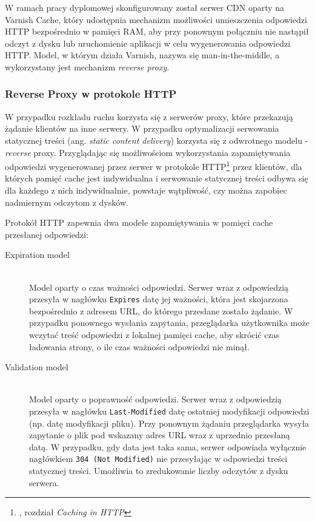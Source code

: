W ramach pracy dyplomowej skonfigurowany został serwer CDN oparty na Varnish Cache, który udostępnia mechanizm możliwości umieszczenia odpowiedzi HTTP bezpośrednio w pamięci RAM, aby przy ponownym połączniu nie nastąpił odczyt z dysku lub uruchomienie aplikacji w celu wygenerowania odpowiedzi HTTP. Model, w którym działa Varnish, nazywa się man-in-the-middle, a wykorzystany jest mechanizm \emph{reverse proxy}.

\subsubsection{Reverse Proxy w protokole HTTP}

W przypadku rozkładu ruchu korzysta się z serwerów proxy, które przekazują żądanie klientów na inne serwery. W przypadku optymalizacji serwowania statycznej treści (ang. \emph{static content delivery}) korzysta się z odwrotnego modelu - \emph{reverse} proxy. Przyglądając się możliwościom wykorzystania zapamiętywania odpowiedzi wygenerowanej przez serwer w protokole HTTP\cite{http-rfc}\footnote{\cite{http-rfc}, rozdział \emph{Caching in HTTP}} przez klientów, dla których pamięć cache jest indywidualna i serwowanie statycznej treści odbywa się dla każdego z nich indywidualnie, powstaje wątpliwość, czy można zapobiec nadmiernym odczytom z dysków.

Protokół HTTP zapewnia dwa modele zapamiętywania w pamięci cache przesłanej odpowiedzi:

\begin{description}
  \item[Expiration model] \hfill \\
  Model oparty o czas ważności odpowiedzi. Serwer wraz z odpowiedzią przesyła w nagłówku \lstinline{Expires} datę jej ważności, która jest skojarzona bezpośrednio z adresem URL, do którego przesłane zostało żądanie. W przypadku ponownego wysłania zapytania, przeglądarka użytkownika może wczytać treść odpowiedzi z lokalnej pamięci cache, aby skrócić czas ładowania strony, o ile czas ważności odpowiedzi nie minął.
  \item[Validation model] \hfill \\
  Model oparty o poprawność odpowiedzi. Serwer wraz z odpowiedzią przesyła w nagłówku \lstinline{Last-Modified} datę ostatniej modyfikacji odpowiedzi (np. datę modyfikacji pliku). Przy ponownym żądaniu przeglądarka wysyła zapytanie o plik pod wskazany adres URL wraz z uprzednio przesłaną datą. W przypadku, gdy data jest taka sama, serwer odpowiada wyłącznie nagłówkiem \lstinline{304 (Not Modified)} nie przesyłając w odpowiedzi treści statycznej treści. Umożliwia to zredukowanie liczby odczytów z dysku serwera.
\end{description}

